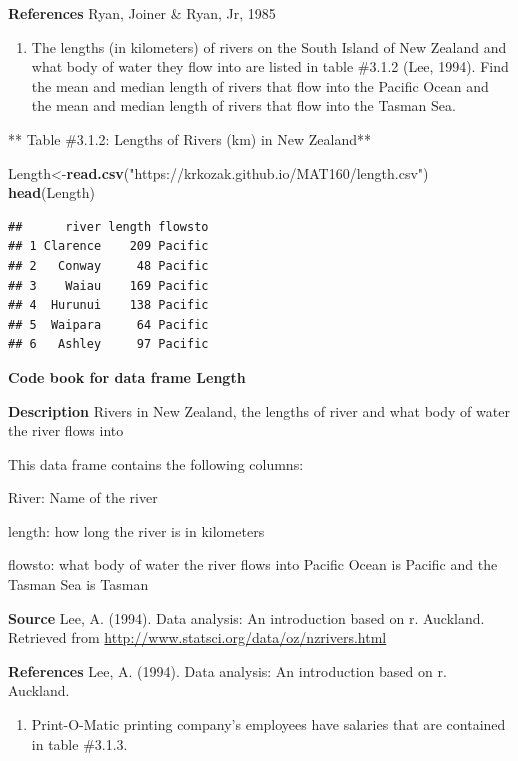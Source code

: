 \documentclass[]{book}
\newenvironment{Shaded}{\begin{snugshade}}{\end{snugshade}}
\newcommand{\KeywordTok}[1]{\textcolor[rgb]{0.13,0.29,0.53}{\textbf{#1}}}
\newcommand{\NormalTok}[1]{#1}
\newcommand{\StringTok}[1]{\textcolor[rgb]{0.31,0.60,0.02}{#1}}
\providecommand{\tightlist}{%
  \setlength{\itemsep}{0pt}\setlength{\parskip}{0pt}}
\begin{document}
\textbf{References}
Ryan, Joiner \& Ryan, Jr, 1985

\begin{enumerate}
\def\labelenumi{\arabic{enumi}.}
\setcounter{enumi}{1}
\tightlist
\item
  The lengths (in kilometers) of rivers on the South Island of New Zealand and what body of water they flow into are listed in table \#3.1.2 (Lee, 1994). Find the mean and median length of rivers that flow into the Pacific Ocean and the mean and median length of rivers that flow into the Tasman Sea.
\end{enumerate}

** Table \#3.1.2: Lengths of Rivers (km) in New Zealand**

\begin{Shaded}
\begin{Highlighting}[]
\NormalTok{Length<-}\KeywordTok{read.csv}\NormalTok{(}\StringTok{"https://krkozak.github.io/MAT160/length.csv"}\NormalTok{)}
\KeywordTok{head}\NormalTok{(Length)}
\end{Highlighting}
\end{Shaded}

\begin{verbatim}
##      river length flowsto
## 1 Clarence    209 Pacific
## 2   Conway     48 Pacific
## 3    Waiau    169 Pacific
## 4  Hurunui    138 Pacific
## 5  Waipara     64 Pacific
## 6   Ashley     97 Pacific
\end{verbatim}

\textbf{Code book for data frame Length}

\textbf{Description}
Rivers in New Zealand, the lengths of river and what body of water the river flows into

This data frame contains the following columns:

River: Name of the river

length: how long the river is in kilometers

flowsto: what body of water the river flows into Pacific Ocean is Pacific and the Tasman Sea is Tasman

\textbf{Source}
Lee, A. (1994). Data analysis: An introduction based on r. Auckland. Retrieved from
\url{http://www.statsci.org/data/oz/nzrivers.html}

\textbf{References}
Lee, A. (1994). Data analysis: An introduction based on r. Auckland.

\begin{enumerate}
\def\labelenumi{\arabic{enumi}.}
\setcounter{enumi}{2}
\tightlist
\item
  Print-O-Matic printing company's employees have salaries that are contained in table \#3.1.3.
\end{enumerate}
\end{document}
